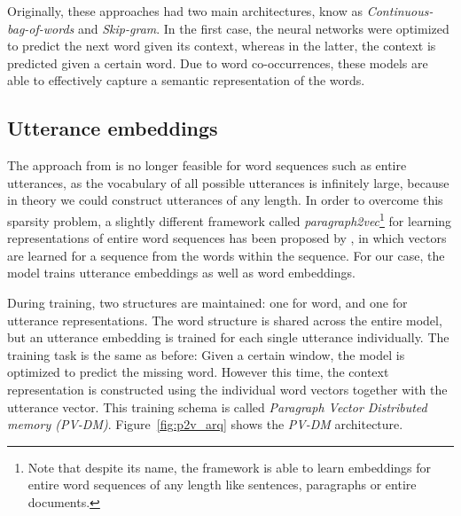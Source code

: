 Originally, these approaches had two main architectures, know as \emph{Continuous-bag-of-words} and \emph{Skip-gram}. In the first case, the neural networks were optimized to predict the next word given its context, whereas in the latter, the context is predicted given a certain word.
Due to word co-occurrences, these models are able to effectively capture a semantic representation of the words. 

\subsection{Utterance embeddings} 
The approach from  is no longer feasible for word sequences such as entire utterances, as the vocabulary of all possible utterances  is infinitely large, because in theory we could construct utterances of any length.
In order to overcome this sparsity problem, a slightly different framework called \emph{paragraph2vec}\footnote{Note that despite its name, the framework is able to learn embeddings for entire word sequences of any length like sentences, paragraphs or entire documents.} for learning representations of entire word sequences has been proposed by , in which vectors are learned for a sequence from the words within the sequence.
For our case, the model trains utterance embeddings as well as word embeddings.

During training, two structures are maintained: one for word, and one for utterance representations.
The word structure is shared across the entire model, but an utterance embedding is trained for each single utterance individually.
The training task is the same as before: Given a certain window, the model is optimized to predict the missing word.
However this time, the context representation is constructed using the individual word vectors together with the utterance vector.
This training schema is called \emph{Paragraph Vector Distributed memory (PV-DM)}.  Figure~\ref{fig:p2v_arq} shows the \emph{PV-DM} architecture.



